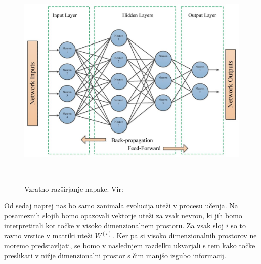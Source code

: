 \begin{figure}[H]
    \centering
    \includegraphics[width=0.7\linewidth]{resources/backpropagation.jpeg}
    \caption{Vzratno razširjanje napake. Vir:~\cite{electronics10212689}}~\label{fig:backprop}
\end{figure}

Od sedaj naprej nas bo samo zanimala evolucija uteži v procesu učenja. Na posameznih slojih bomo opazovali vektorje uteži za vsak nevron, ki jih bomo interpretirali kot točke v visoko dimenzionalnem prostoru. Za vsak sloj $i$ so to  ravno vrstice v matriki uteži $W^{(i)}$. Ker pa si visoko dimenzionalnih prostorov ne moremo predstavljati, se bomo v naslednjem razdelku ukvarjali s tem kako točke preslikati v nižje dimenzionalni prostor s čim manjšo izgubo informacij.
